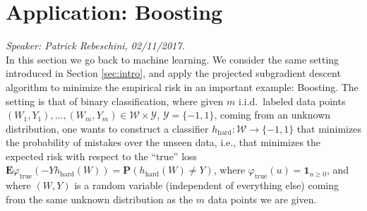 
\section{Application: Boosting}

\emph{Speaker: Patrick Rebeschini, 02/11/2017.}\\

In this section we go back to machine learning. We consider the same setting introduced in Section \ref{sec:intro}, and apply the projected subgradient descent algorithm to minimize the empirical risk in an important example: Boosting. The setting is that of binary classification, where given $m$ i.i.d.\ labeled data points $(W_1,Y_1),\ldots,(W_m,Y_m)\in\mathcal{W}\times\mathcal{Y}$, $\mathcal{Y}=\{-1,1\}$, coming from an unknown distribution, one wants to construct a classifier $h_\text{hard}:\mathcal{W} \rightarrow \{-1,1\}$ that minimizes the probability of mistakes over the unseen data, i.e., that minimizes the expected risk with respect to the ``true'' loss $\mathbf{E} \varphi_\text{true}(-Yh_\text{hard}(W))=\mathbf{P} (h_\text{hard}(W)\neq Y)$, where $\varphi_\text{true}(u) = \mathbf{1}_{u\ge 0}$, and where $(W,Y)$ is a random variable (independent of everything else) coming from the same unknown distribution as the $m$ data points we are given.

